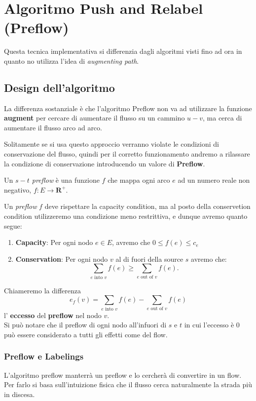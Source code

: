 \chapter{Algoritmo Push and Relabel (Preflow)}

Questa tecnica implementativa si differenzia dagli algoritmi visti fino ad ora in
quanto no utilizza l'idea di \textit{augmenting path}.

\section{Design dell'algoritmo}

La differenza sostanziale è che l'algoritmo Preflow non va ad utilizzare la funzione \textbf{augment} per cercare di aumentare il flusso su un cammino $u - v$, ma cerca di aumentare il flusso arco ad arco.

Solitamente se si usa questo approccio verranno violate le condizioni di conservazione del flusso, quindi per il corretto funzionamento andremo a rilassare la condizione di conservazione introducendo un valore di \textbf{Preflow}.

\begin{myblockquote}
    Un \textit{$s-t$ preflow } è una funzione $f$ che mappa ogni arco $e$ ad un numero reale non negativo, $f: E \rightarrow \mathbf{R^+}$.
\end{myblockquote}

Un \textit{preflow} $f$ deve rispettare la capacity condition, ma al posto della conservetion condition utilizzeremo una condizione meno restrittiva, e dunque avremo quanto segue:
\begin{enumerate}
    \item \textbf{Capacity}: Per ogni nodo $e \in E$, avremo che $0 \le f(e) \le c_e$
    \item \textbf{Conservation}: Per ogni nodo $v$ al di fuori della source $s$ avremo che:
    $$
        \sum_{e \text{ into }v}f(e) \ge \sum_{e \text{ out of }v}f(e).
    $$
\end{enumerate}

Chiameremo la differenza
$$
    e_f(v) = \sum_{e \text{ into }v}f(e) - \sum_{e \text{ out of }v}f(e)
$$
l' \textbf{eccesso} del \textbf{preflow} nel nodo $v$.\\

Si può notare che il preflow di ogni nodo all'infuori di $s$ e $t$ in cui l'eccesso è 0 può essere considerato a tutti gli effetti come del flow.

\subsection{Preflow e Labelings}
L'algoritmo preflow manterrà un preflow e lo cercherà di convertire in un flow.
Per farlo si basa sull'intuizione fisica che il flusso cerca naturalmente la strada più in discesa.

